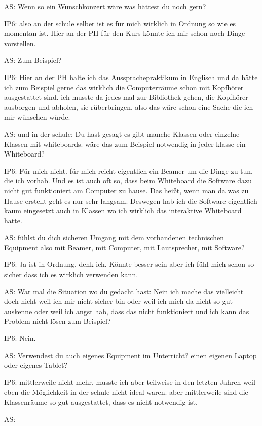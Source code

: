 \documentclass[fontsize=11pt,paper=a4]{scrbook}
\begin{document}
{\begin{itemize*}
\item[AS:] Wenn so ein Wunschkonzert
wäre was hättest du noch gern?
\item[IP6:]  also an
der schule selber ist es für mich
wirklich in Ordnung so wie es momentan ist. Hier an der PH für den Kurs
könnte ich mir schon noch Dinge vorstellen.
\item[AS:] Zum Beispiel? 
\item[IP6:] Hier an der PH halte ich das Aussprachepraktikum in Englisch und da hätte ich zum Beispiel gerne das
wirklich die Computerräume schon mit Kopfhörer ausgestattet sind.
ich musste da jedes mal zur Bibliothek 
gehen, die Kopfhörer ausborgen und abholen, 
sie rüberbringen. also das wäre schon eine
Sache die ich mir wünschen würde.
\item[AS:] und
in der schule: Du hast gesagt es gibt manche
Klassen oder einzelne Klassen mit
whiteboards. wäre das zum Beispiel
notwendig in jeder klasse ein Whiteboard?
\item[IP6:] Für mich nicht.
für mich reicht eigentlich ein Beamer um die Dinge zu tun, die ich vorhab. Und es ist auch oft so, dass beim Whiteboard die Software dazu nicht
gut funktioniert am Computer zu hause. Das heißt, wenn man da was zu Hause erstellt 
geht es nur sehr langsam. Deswegen hab ich die Software eigentlich
kaum eingesetzt auch in Klassen wo ich
wirklich das interaktive Whiteboard hatte.
\item[AS:] fühlst du dich sicheren Umgang mit
dem vorhandenen technischen Equipment
also mit Beamer, mit Computer, mit Lautsprecher, mit Software?
\item[IP6:] Ja ist in Ordnung, denk ich. Könnte besser sein aber ich fühl mich schon so sicher
dass ich es wirklich verwenden kann.
\item[AS:] War mal die Situation wo du 
gedacht hast: Nein ich mache das vielleicht
doch nicht weil ich mir nicht sicher
bin oder weil ich mich da nicht so gut
auskenne oder weil ich angst hab, dass das nicht
funktioniert und ich kann das Problem nicht lösen zum Beispiel?
\item[IP6:] Nein.
\item[AS:] Verwendest du auch eigenes Equipment im
Unterricht? einen eigenen Laptop oder eigenes Tablet?
\item[IP6:] mittlerweile
nicht mehr. musste ich aber teilweise in
den letzten Jahren weil eben die
Möglichkeit in der schule nicht ideal
waren. 
aber mittlerweile sind die Klassenräume so
gut ausgestattet, dass es nicht notwendig
ist.
\item[AS:] 

\end{itemize*}}
\end{document}
